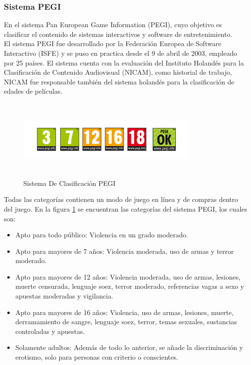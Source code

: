 \subsubsection{Sistema PEGI}

En el sistema Pan European Game Information (PEGI), cuyo objetivo es clasificar el contenido de sistemas interactivos y software de entretenimiento. 
\\
El sistema PEGI fue desarrollado por la Federación Europea de Software Interactivo (ISFE) y se puso en practica desde el 9 de abril de 2003, empleado por 25 países. El sistema cuenta con la evaluación del Instituto Holandés para la Clasificación de Contenido Audiovisual (NICAM), como historial de trabajo, NICAM fue responsable también del sistema holandés para la clasificación de edades de películas.

\begin{figure}[t!]
	\centering
	\includegraphics[width=9cm,height=4cm,]{./Images/pegi.png}
	\caption{Sistema De Clasificación PEGI}
	\label{pegi}
\end{figure}
Todas las categorías contienen un modo de juego en línea y de compras dentro del juego. En la figura \ref{pegi} se encuentran las categorías del sistema PEGI, los cuales son:
\begin{itemize}
	\item Apto para todo público: Violencia en un grado moderado.
	\item Apto para mayores de 7 años: Violencia moderada, uso de armas y terror moderado.
	\item Apto para mayores de 12 años: Violencia moderada, uso de armas, lesiones, muerte censurada, lenguaje soez, terror moderado, referencias vagas a sexo y apuestas moderadas y vigilancia.
	\item Apto para mayores de 16 años: Violencia, uso de armas, lesiones, muerte, derramamiento de sangre, lenguaje soez, terror, temas sexuales, sustancias controladas y apuestas.
	\item Solamente adultos: Además de todo lo anterior, se añade la discriminación y erotismo, solo para personas con criterio o conscientes.
\end{itemize}


